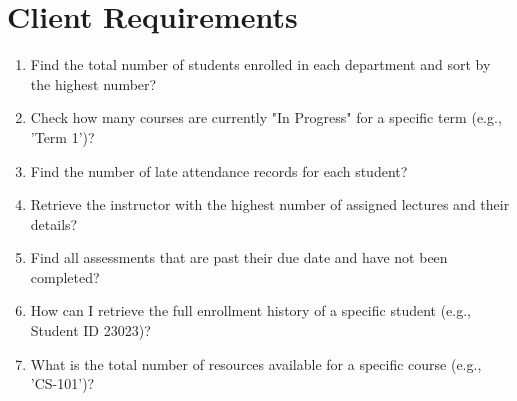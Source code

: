 \documentclass[12pt,a4paper]{report}
\begin{document}
\section{Client Requirements}
\begin{enumerate}
\item Find the total number of students enrolled in each department and sort by the highest number?
\item Check how many courses are currently "In Progress" for a specific term (e.g., 'Term 1')?
\item Find the number of late attendance records for each student?
\item Retrieve the instructor with the highest number of assigned lectures and their details?
\item Find all assessments that are past their due date and have not been completed?
\item How can I retrieve the full enrollment history of a specific student (e.g., Student ID 23023)?
\item What is the total number of resources available for a specific course (e.g., 'CS-101')?
\end{enumerate}
\newline
\end{document}
